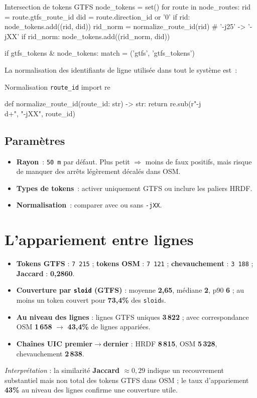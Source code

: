 \begin{codebox}[language=Python]{Intersection de tokens GTFS}
node_tokens = set()
for route in node_routes:
    rid = route.gtfs_route_id
    did = route.direction_id or '0'
    if rid:
        node_tokens.add((rid, did))
        rid_norm = normalize_route_id(rid)  # '-j25' -> '-jXX'
        if rid_norm:
            node_tokens.add((rid_norm, did))

if gtfs_tokens & node_tokens:
    match = ('gtfs', 'gtfs_tokens')
\end{codebox}

La normalisation des identifiants de ligne utilisée dans tout le système est :

\begin{codebox}[language=Python]{Normalisation \texttt{route\_id}}
import re

def normalize_route_id(route_id: str) -> str:
    return re.sub(r"-j\\d+", "-jXX", route_id)
\end{codebox}

\subsection{Paramètres}
\begin{itemize}
  \item \textbf{Rayon} : \texttt{50 m} par défaut. Plus petit $\Rightarrow$ moins de faux positifs, mais risque de manquer des arrêts légèrement décalés dans OSM.
  \item \textbf{Types de tokens} : activer uniquement GTFS ou inclure les paliers HRDF.
  \item \textbf{Normalisation} : comparer avec ou sans \texttt{-jXX}.
\end{itemize}

\section{L'appariement entre lignes}
\begin{itemize}
  \item \textbf{Tokens GTFS} : \texttt{7\,215} ; \textbf{tokens OSM} : \texttt{7\,121} ; \textbf{chevauchement} : \texttt{3\,188} ; \textbf{Jaccard} : \textbf{0,2860}.
  \item \textbf{Couverture par \texttt{sloid} (GTFS)} : moyenne \textbf{2,65}, médiane \textbf{2}, p90 \textbf{6} ; au moins un token couvert pour \textbf{73,4\%} des \texttt{sloid}s.
  \item \textbf{Au niveau des lignes} : lignes GTFS uniques \textbf{3\,822} ; avec correspondance OSM \textbf{1\,658} $\rightarrow$ \textbf{43,4\%} de lignes appariées.
  \item \textbf{Chaînes UIC premier$\rightarrow$dernier} : HRDF \textbf{8\,815}, OSM \textbf{5\,328}, chevauchement \textbf{2\,838}.
\end{itemize}
\noindent \emph{Interprétation} : la similarité \textbf{Jaccard $\approx 0{,}29$} indique un recouvrement substantiel mais non total des tokens GTFS dans OSM ; le taux d'appariement \textbf{43\%} au niveau des lignes confirme une couverture utile.


